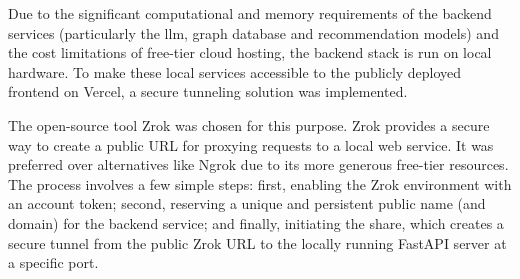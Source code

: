 Due to the significant computational and memory requirements of the backend services (particularly the \ac{llm}, graph database and recommendation models) and the cost limitations of free-tier cloud hosting, the backend stack is run on local hardware. To make these local services accessible to the publicly deployed frontend on Vercel, a secure tunneling solution was implemented.

The open-source tool Zrok \cite{ZROK} was chosen for this purpose. Zrok provides a secure way to create a public URL for proxying requests to a local web service. It was preferred over alternatives like Ngrok due to its more generous free-tier resources. The process involves a few simple steps: first, enabling the Zrok environment with an account token; second, reserving a unique and persistent public name (and domain) for the backend service; and finally, initiating the share, which creates a secure tunnel from the public Zrok URL to the locally running FastAPI server at a specific port.